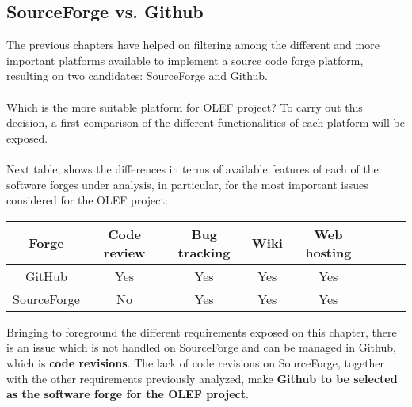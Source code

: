 \documentclass[11pt]{article}
\begin{document}
\subsection{SourceForge vs. Github}
The previous chapters have helped on filtering among the different and more important platforms available to implement a source code forge platform, resulting on two candidates: SourceForge and Github.\\
\\
Which is the more suitable platform for OLEF project? To carry out this decision, a first comparison of the different functionalities of each platform will be exposed.\\
\\
Next table, shows the differences in terms of available features of each of the software forges under analysis, in particular, for the most important issues considered for the OLEF project:\\
\begin{center}
  \begin{tabular}{ | c | c | c | c | c | c | c | c | }
    \hline
    \textbf{Forge} & \textbf{Code review} & \textbf{Bug tracking} & \textbf{Wiki} & \textbf{Web hosting} \\
    \hline
    GitHub & Yes & Yes & Yes & Yes\\ 
    \hline
    SourceForge & No & Yes & Yes & Yes\\
    \hline
  \end{tabular}
\end{center}
Bringing to foreground the different requirements exposed on this chapter, there is an issue which is not handled on SourceForge and can be managed in Github, which is \textbf{code revisions}. The lack of code revisions on SourceForge, together with the other requirements previously analyzed, make \textbf{Github to be selected as the software forge for the OLEF project}.
\end{document}
